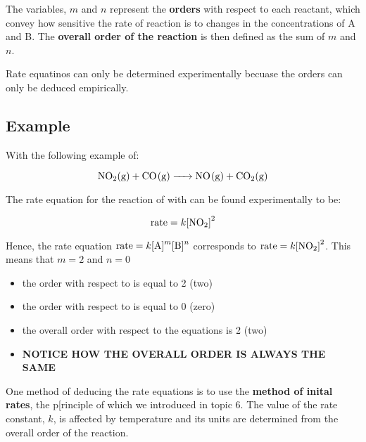 \documentclass{article}
\begin{document}
The variables, $m$ and $n$ represent the \textbf{orders} with respect to each reactant, which convey how sensitive the rate of reaction is to changes in the concentrations of A and B. The \textbf{overall order of the reaction} is then defined as the sum of $m$ and $n$.

\begin{center} \end{center}

Rate equatinos can only be determined experimentally becuase the orders can only be deduced empirically.

\subsection{Example}
With the following example of:

$$\ce{NO2(g) + CO(g) -> NO(g) + CO2(g)}$$

The rate equation for the reaction of  with  can be found experimentally to be:

$$\ce{rate} = k\ce{[NO2]}^{2}$$

Hence, the rate equation $\ce{rate} = k\ce{[A]^{m}[B]^{n}}$ corresponds to $\ce{rate} = k\ce{[NO2]}^{2}$. This means that $m = 2$ and $n = 0$

\begin{itemize}
\item the order with respect to  is equal to 2 (two)
\item the order with respect to  is equal to 0 (zero)
\item the overall order with respect to the equations is 2 (two)
\item \textbf{NOTICE HOW THE OVERALL ORDER IS ALWAYS THE SAME}
\end{itemize}

One method of deducing the rate equations is to use the \textbf{method of inital rates}, the p[rinciple of which we introduced in topic 6. The value of the rate constant, $k$, is affected by temperature and its units are determined from the overall order of the reaction.
\end{document}
